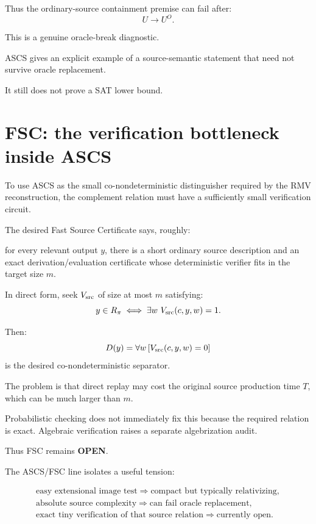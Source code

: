 \documentclass[11pt]{article}
\newcommand{\statusopen}{\textcolor{openstatus}{\textbf{OPEN}}}
\theoremstyle{plain}
\theoremstyle{definition}
\theoremstyle{remark}
\begin{document}
Thus the ordinary-source containment premise can fail after:
\[
U\to U^O.
\]

This is a genuine oracle-break diagnostic.

\begin{provedbox}
ASCS gives an explicit example of a source-semantic statement that need not
survive oracle replacement.

It still does not prove a SAT lower bound.
\end{provedbox}

\section{FSC: the verification bottleneck inside ASCS}

To use ASCS as the small co-nondeterministic distinguisher required by the RMV
reconstruction, the complement relation must have a sufficiently small
verification circuit.

The desired Fast Source Certificate says, roughly:

for every relevant output \(y\), there is a short ordinary source description
and an exact derivation/evaluation certificate whose deterministic verifier
fits in the target size \(m\).

In direct form, seek \(V_{\rm src}\) of size at most \(m\) satisfying:
\[
y\in R_\pi
\iff
\exists w\ V_{\rm src}(c,y,w)=1.
\]

Then:
\[
D(y)
=
\forall w\,[V_{\rm src}(c,y,w)=0]
\]
is the desired co-nondeterministic separator.

The problem is that direct replay may cost the original source production
time \(T\), which can be much larger than \(m\).

Probabilistic checking does not immediately fix this because the required
relation is exact.  Algebraic verification raises a separate algebrization
audit.

Thus FSC remains \statusopen.

\begin{explainbox}
The ASCS/FSC line isolates a useful tension:

\[
\boxed{
\begin{array}{c}
\text{easy extensional image test}
\Rightarrow
\text{compact but typically relativizing},\\
\text{absolute source complexity}
\Rightarrow
\text{can fail oracle replacement},\\
\text{exact tiny verification of that source relation}
\Rightarrow
\text{currently open}.
\end{array}}
\]
\end{explainbox}
\end{document}
